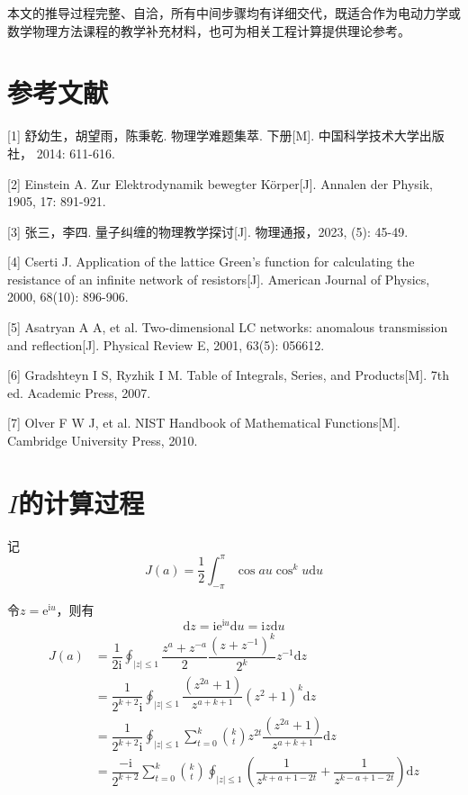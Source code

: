 \documentclass{article} %
\newcommand{\di}{\mathrm{d}}
\newcommand{\ii}{\mathrm{i}}
\newcommand{\e}[1]{\mathrm{e}^{#1}}
\begin{document}
本文的推导过程完整、自洽，所有中间步骤均有详细交代，既适合作为电动力学或
数学物理方法课程的教学补充材料，也可为相关工程计算提供理论参考。

\section*{参考文献}

[1] 舒幼生，胡望雨，陈秉乾. 物理学难题集萃. 下册[M]. 中国科学技术大学出版社，
2014: 611-616.

[2] Einstein A. Zur Elektrodynamik bewegter Körper[J]. Annalen der Physik,
1905, 17: 891-921.

[3] 张三，李四. 量子纠缠的物理教学探讨[J]. 物理通报，2023, (5): 45-49.

[4] Cserti J. Application of the lattice Green's function for calculating
the resistance of an infinite network of resistors[J]. American Journal of
Physics, 2000, 68(10): 896-906.

[5] Asatryan A A, et al. Two-dimensional LC networks: anomalous transmission
and reflection[J]. Physical Review E, 2001, 63(5): 056612.

[6] Gradshteyn I S, Ryzhik I M. Table of Integrals, Series, and Products[M]. 7th ed. Academic Press, 2007.

[7] Olver F W J, et al. NIST Handbook of Mathematical Functions[M]. Cambridge University Press, 2010.

\appendix
\section{$I$的计算过程}\label{A}
记
\begin{equation}
  J(a)=\dfrac{1}{2}\int_{-\pi}^\pi\cos au\cos^ku\di u
\end{equation}

令$z=\e{\ii u}$，则有
\begin{equation}
  \di z=\ii\e{\ii u}\di u=\ii z\di u
\end{equation}
\begin{align*}
  J(a)&=\dfrac{1}{2\ii}\oint_{|z|\leqslant1}\dfrac{z^a+z^{-a}}{2}\dfrac{\left(z+z^{-1}\right)^k}{2^k}z^{-1}\di z\\
  &=\dfrac{1}{2^{k+2}\ii}\oint_{|z|\leqslant1}\dfrac{\left(z^{2a}+1\right)}{z^{a+k+1}}\left(z^2+1\right)^k\di z\\
  &=\dfrac{1}{2^{k+2}\ii}\oint_{|z|\leqslant1}\sum_{t=0}^{k}\binom{k}{t}z^{2t}\dfrac{\left(z^{2a}+1\right)}{z^{a+k+1}}\di z\\
  &=\dfrac{-\ii}{2^{k+2}}\sum_{t=0}^{k}\binom{k}{t}\oint_{|z|\leqslant1}\left(\dfrac{1}{z^{k+a+1-2t}}+\dfrac{1}{z^{k-a+1-2t}}\right)\di z\\
\end{align*}
\end{document}
